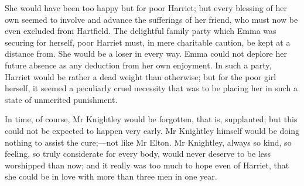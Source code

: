She would have been too happy but for poor Harriet; but every blessing of her own seemed to involve and advance the sufferings of her friend, who must now be even excluded from Hartfield. The delightful family party which Emma was securing for herself, poor Harriet must, in mere charitable caution, be kept at a distance from. She would be a loser in every way. Emma could not deplore her future absence as any deduction from her own enjoyment. In such a party, Harriet would be rather a dead weight than otherwise; but for the poor girl herself, it seemed a peculiarly cruel necessity that was to be placing her in such a state of unmerited punishment.

In time, of course, Mr Knightley would be forgotten, that is, supplanted; but this could not be expected to happen very early. Mr Knightley himself would be doing nothing to assist the cure;—not like Mr Elton. Mr Knightley, always so kind, so feeling, so truly considerate for every body, would never deserve to be less worshipped than now; and it really was too much to hope even of Harriet, that she could be in love with more than three men in one year.
